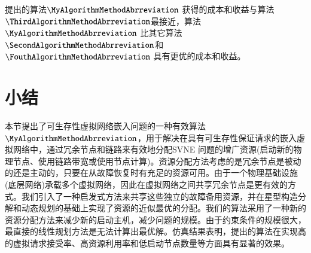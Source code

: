 提出的算法$\MyAlgorithmMethodAbrreviation$ 获得的成本和收益与算法$\ThirdAlgorithmMethodAbrreviation$最接近，算法$\MyAlgorithmMethodAbrreviation$ 比其它算法$\SecondAlgorithmMethodAbrreviation$和$\FouthAlgorithmMethodAbrreviation$ 具有更优的成本和收益。




\section{小结}
本节提出了可生存性虚拟网络嵌入问题的一种有效算法$\MyAlgorithmMethodAbrreviation$，用于解决在具有可生存性保证请求的嵌入虚拟网络中，通过冗余节点和链路来有效地分配SVNE 问题的增广资源(启动新的物理节点、使用链路带宽或使用节点计算)。资源分配方法考虑的是冗余节点是被动的还是主动的，只要在从故障恢复时有充足的资源可用。由于一个物理基础设施(底层网络)承载多个虚拟网络，因此在虚拟网络之间共享冗余节点是更有效的方式。我们引入了一种启发式方法来共享这些独立的故障备用资源，并在星型构造分解和动态规划的基础上实现了资源的近似最优的分配。我们的算法采用了一种新的资源分配方法来减少新的启动主机，减少问题的规模。由于约束条件的规模很大，最直接的线性规划方法是无法计算出最优解。仿真结果表明，提出的算法在实现高的虚拟请求接受率、高资源利用率和低启动节点数量等方面具有显著的效果。
